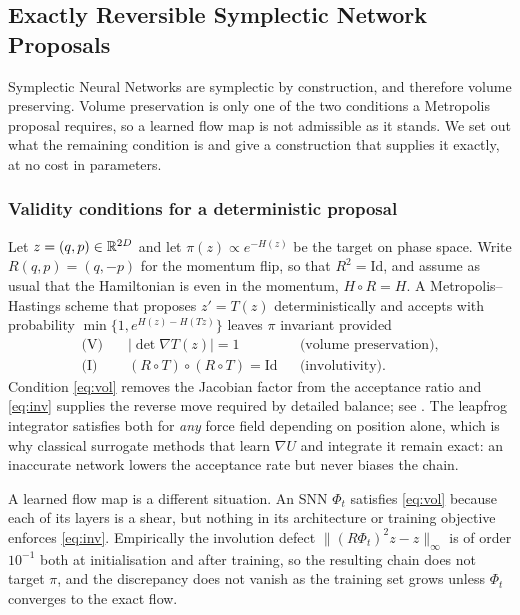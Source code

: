 %   

\subsection{Exactly Reversible Symplectic Network Proposals}
\label{sec:symmetrization}

Symplectic Neural Networks are symplectic by construction, and therefore
volume preserving. Volume preservation is only one of the two conditions a
Metropolis proposal requires, so a learned flow map is not admissible as it
stands. We set out what the remaining condition is and give a construction that
supplies it exactly, at no cost in parameters.

\subsubsection{Validity conditions for a deterministic proposal}

Let $z = (q,p) \in \mathbb{R}^{2D}$ and let $\pi(z) \propto e^{-H(z)}$ be the target on
phase space. Write $R(q,p) = (q,-p)$ for the momentum flip, so that
$R^2 = \mathrm{Id}$, and assume as usual that the Hamiltonian is even in the
momentum, $H \circ R = H$. A Metropolis--Hastings scheme that proposes
$z' = T(z)$ deterministically and accepts with probability
$\min\{1, e^{H(z) - H(T z)}\}$ leaves $\pi$ invariant provided
\begin{align}
    \text{(V)} \quad & |\det \nabla T(z)| = 1 &&\text{(volume preservation),} \label{eq:vol}\\
    \text{(I)} \quad & (R \circ T) \circ (R \circ T) = \mathrm{Id} &&\text{(involutivity).} \label{eq:inv}
\end{align}
Condition \eqref{eq:vol} removes the Jacobian factor from the acceptance ratio
and \eqref{eq:inv} supplies the reverse move required by detailed balance; see
\cite{Green1995, Tierney1998}. The leapfrog integrator satisfies both for
\emph{any} force field depending on position alone, which is why classical
surrogate methods that learn $\nabla U$ and integrate it remain exact: an
inaccurate network lowers the acceptance rate but never biases the chain.

A learned flow map is a different situation. An SNN $\Phi_t$ satisfies
\eqref{eq:vol} because each of its layers is a shear, but nothing in its
architecture or training objective enforces \eqref{eq:inv}. Empirically the
involution defect $\|(R\Phi_t)^2 z - z\|_\infty$ is of order $10^{-1}$ both at
initialisation and after training, so the resulting chain does not target
$\pi$, and the discrepancy does not vanish as the training set grows unless
$\Phi_t$ converges to the exact flow.

